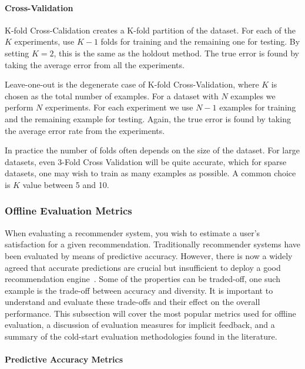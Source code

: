 \paragraph{Cross-Validation}

K-fold Cross-Calidation creates a K-fold partition of the dataset. For each of
the $K$ experiments, use $K-1$ folds for training and the remaining one for
testing. By setting $K=2$, this is the same as the holdout method. The true
error is found by taking the average error from all the experiments.

Leave-one-out is the degenerate case of K-fold Cross-Validation, where $K$ is
chosen as the total number of examples. For a dataset with $N$ examples we
perform $N$ experiments. For each experiment we use $N-1$ examples for training
and the remaining example for testing. Again, the true error is found by taking
the average error rate from the experiments.

In practice the number of folds often depends on the size of the dataset. For
large datasets, even 3-Fold Cross Validation will be quite accurate, which for
sparse datasets, one may wish to train as many examples as possible. A common
choice is $K$ value between 5 and 10.


\subsubsection{Offline Evaluation Metrics}

When evaluating a recommender system, you wish to estimate a user's
satisfaction for a given recommendation. Traditionally recommender systems have
been evaluated by means of predictive accuracy. However, there is now a widely
agreed that accurate predictions are crucial but insufficient to deploy a good
recommendation engine~\cite{Shani2011, McNee2006}. Some of the properties can
be traded-off, one such example is the trade-off between accuracy and
diversity. It is important to understand and evaluate these trade-offs and
their effect on the overall performance. This subsection will cover the most
popular metrics used for offline evaluation, a discussion of evaluation
measures for implicit feedback, and a summary of the cold-start evaluation
methodologies found in the literature.

\paragraph{Predictive Accuracy Metrics}

